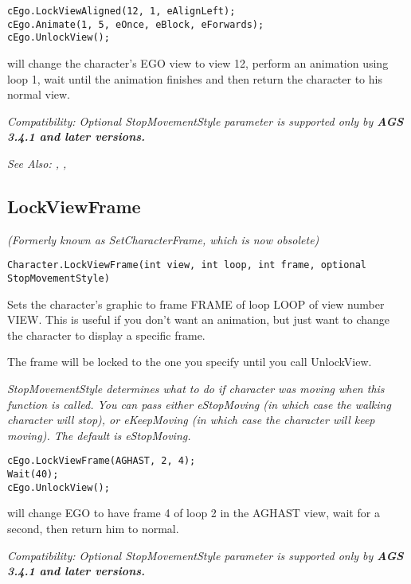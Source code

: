 \begin{verbatim}
cEgo.LockViewAligned(12, 1, eAlignLeft);
cEgo.Animate(1, 5, eOnce, eBlock, eForwards);
cEgo.UnlockView();
\end{verbatim}
will change the character's EGO view to view 12, perform an animation using loop 1,
wait until the animation finishes and then return the character to his normal view.

\it{Compatibility:} Optional \it{StopMovementStyle} parameter is supported only by \bf{AGS 3.4.1} and later versions.

\it{See Also:} ,
,


\subsection{LockViewFrame}\label{Character.LockViewFrame}%

\it{(Formerly known as SetCharacterFrame, which is now obsolete)}

\begin{verbatim}
Character.LockViewFrame(int view, int loop, int frame, optional StopMovementStyle)
\end{verbatim}
Sets the character's graphic to frame FRAME of loop LOOP of view number VIEW.
This is useful if you don't want an animation, but just want to change the
character to display a specific frame.

The frame will be locked to the one you specify until you call UnlockView.

\it{StopMovementStyle} determines what to do if character was moving when this function is called. You can pass either eStopMoving (in which case the walking character will stop), or eKeepMoving (in which case the character will keep moving). The default is eStopMoving.

\begin{verbatim}
cEgo.LockViewFrame(AGHAST, 2, 4);
Wait(40);
cEgo.UnlockView();
\end{verbatim}
will change EGO to have frame 4 of loop 2 in the AGHAST view, wait for a second,
then return him to normal.

\it{Compatibility:} Optional \it{StopMovementStyle} parameter is supported only by \bf{AGS 3.4.1} and later versions.

